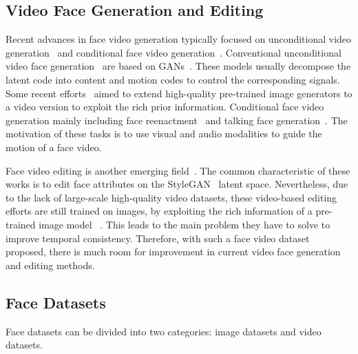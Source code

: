\subsection{Video Face Generation and Editing}

\begin{sloppypar}

Recent advances in face video generation typically focused on unconditional video generation~\cite{vgan,tgan,mocogan,digan,mocoganhd,styleganv} and conditional face video generation~\cite{wayne2018reenactgan,fomm,bilayermodel,wang2021facevid2vid,zhou2019talking,chen2019hierarchical,zhu2021arbitrary,zhou2021pose,ji2021audio}. Conventional unconditional video face generation~\cite{vgan,tgan,mocogan,digan} are based on GANs~\cite{gan}. These models usually decompose the latent code into content and motion codes to control the corresponding signals. Some recent efforts~\cite{mocoganhd,styleganv} aimed to extend high-quality pre-trained image generators to a video version to exploit the rich prior information. Conditional face video generation mainly including face reenactment~\cite{wayne2018reenactgan,fomm,bilayermodel,wang2021facevid2vid} and talking face generation~\cite{zhou2019talking,chen2019hierarchical,zhu2021arbitrary,zhou2021pose,ji2021audio}. The motivation of these tasks is to use visual and audio modalities to guide the motion of a face video.
\end{sloppypar}

Face video editing is another emerging field~\cite{yao2021latent,tzaban2022stitch}. The common characteristic of these works is to edit face attributes on the StyleGAN~\cite{stylegan2} latent space. Nevertheless, due to the lack of large-scale high-quality video datasets, these video-based editing efforts are still trained on images, by exploiting the rich information of a pre-trained image model ~\cite{stylegan2}. This leads to the main problem they have to solve to improve temporal consistency. Therefore, with such a face video dataset proposed, there is much room for improvement in current video face generation and editing methods.

\subsection{Face Datasets} Face datasets can be divided into two categories: image datasets and video datasets. 

